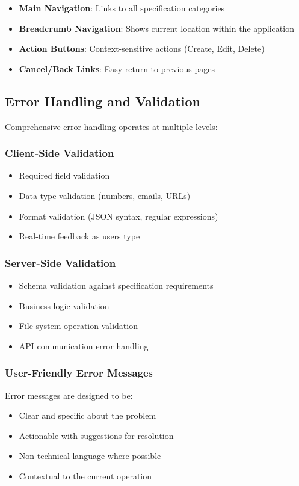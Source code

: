 \documentclass[11pt,a4paper]{article}
\begin{document}
\begin{itemize}
    \item \textbf{Main Navigation}: Links to all specification categories
    \item \textbf{Breadcrumb Navigation}: Shows current location within the application
    \item \textbf{Action Buttons}: Context-sensitive actions (Create, Edit, Delete)
    \item \textbf{Cancel/Back Links}: Easy return to previous pages
\end{itemize}

\subsection{Error Handling and Validation}

Comprehensive error handling operates at multiple levels:

\subsubsection{Client-Side Validation}
\begin{itemize}
    \item Required field validation
    \item Data type validation (numbers, emails, URLs)
    \item Format validation (JSON syntax, regular expressions)
    \item Real-time feedback as users type
\end{itemize}

\subsubsection{Server-Side Validation}
\begin{itemize}
    \item Schema validation against specification requirements
    \item Business logic validation
    \item File system operation validation
    \item API communication error handling
\end{itemize}

\subsubsection{User-Friendly Error Messages}
Error messages are designed to be:
\begin{itemize}
    \item Clear and specific about the problem
    \item Actionable with suggestions for resolution
    \item Non-technical language where possible
    \item Contextual to the current operation
\end{itemize}
\end{document}
